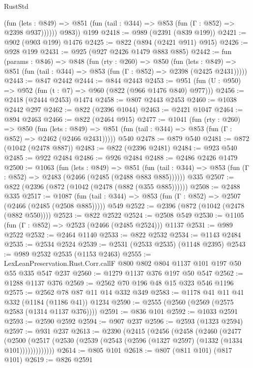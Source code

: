 \begin{lexlean}{RustStd}
\begin{coremodule}
{\begin{coremodule}
{{{{{{{{{              (fun (lets : @849) =>
              @851 (fun (tail : @344) => @853 (fun (Γ : @852) => @2398 @937))))))
        @983))
    @199
@2418 := @989 (@2391 (@839 @199))
@2421 := @902 (@903 @199) @1476
@2425 := @822 (@894 (@2421 @911) @915)
@2426 := @928 @199
@2431 := @925 (@927 @2426 @1479 @883 @885)
@2442 := fun (params : @846) =>
  @848
    (fun (rty : @260) =>
    @850
      (fun (lets : @849) =>
      @851 (fun (tail : @344) => @853 (fun (Γ : @852) => @2398 (@2425 @2431)))))
@2443 := @847 @2442
@2444 := @844 @2443
@2453 := @951 (fun (U : @950) => @952 (fun (t : @7) => @960 (@822 (@966 @1476 @840) @977)))
@2456 := @2418 (@2444 @2453) @1474
@2458 := @807 @2443 @2453
@2460 := @1038 @2442 @297
@2462 := @822 (@2396 @1044)
@2463 := @2421 @1047
@2464 := @894 @2463
@2466 := @822 (@2464 @915)
@2477 := @1041
    (fun (rty : @260) =>
    @850
      (fun (lets : @849) =>
      @851 (fun (tail : @344) => @853 (fun (Γ : @852) => @2462 (@2466 @2431)))))
    @540
@2478 := @879 @540
@2481 := @872 (@1042 (@2478 @887))
@2483 := @822 (@2396 @2481)
@2484 := @923 @540
@2485 := @922 @2484
@2486 := @926 @2484
@2488 := @2486 @2426 @1479
@2500 := @1063
    (fun (lets : @849) =>
    @851 (fun (tail : @344) => @853 (fun (Γ : @852) => @2483 (@2466 (@2485 (@2488 @883 @885))))))
    @335
@2507 := @822 (@2396 (@872 (@1042 (@2478 (@882 (@355 @885))))))
@2508 := @2488 @335
@2517 := @1087
    (fun (tail : @344) => @853 (fun (Γ : @852) => @2507 (@2466 (@2485 (@2508 @885)))))
    @549
@2522 := @2396 (@872 (@1042 (@2478 (@882 @550))))
@2523 := @822 @2522
@2524 := @2508 @549
@2530 := @1105 (fun (Γ : @852) => @2523 (@2466 (@2485 @2524))) @1137
@2531 := @989 @2522
@2532 := @2464 @1140
@2533 := @822 @2532
@2534 := @1143 @2484
@2535 := @2534 @2524
@2539 := @2531 (@2533 @2535) (@1148 @2395)
@2543 := @989 @2532 @2535 (@1153 @2463)
@2555 := LexLeanPreservation.Rust.Corr.callF @800 @802 @804 @1137 @101 @197 @50 @55 @335 @547 @237
@2560 := @1279 @1137 @376 @197 @50 @547
@2562 := @1288 @1137 @376
@2569 := @2562 @70 @196 @48 @15 @323 @546 @1196
@2575 := @2562 @78 @87 @11 @14 @332 @349
@2583 := @1178 @41 @11 @41 @332 (@1184 (@1186 @41)) @1234
@2590 := @2555 (@2560 (@2569 (@2575 @2583 (@1314 @1137 @376))))
@2591 := @836 @101
@2592 := @1033 @2591
@2593 := @2590 @2592
@2594 := @907 @237
@2596 := @2593 (@1323 @2594)
@2597 := @931 @237
@2613 := @2390
    (@2415
      (@2456
        (@2458
          (@2460
            (@2477
              (@2500
                (@2517 (@2530 (@2539 (@2543 (@2596 (@1327 @2597) (@1332 (@1334 @101)))))))))))))
@2614 := @805 @101
@2618 := @807 (@811 @101) (@817 @101)
@2619 := @826 @2591
}}}}}}}}}
\end{coremodule}}
\end{coremodule}
\end{lexlean}

